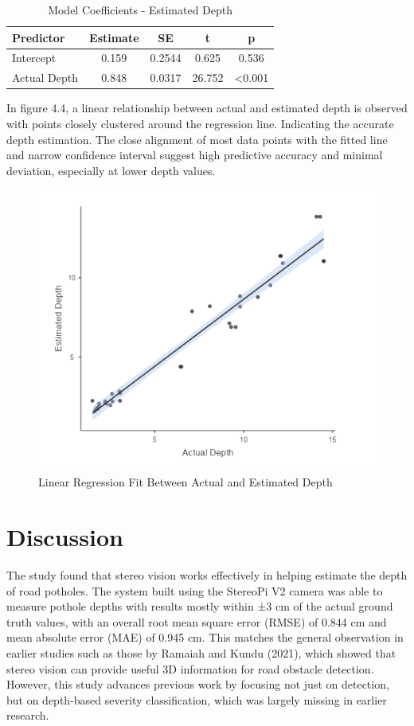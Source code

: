 \begin{table}[H]
	\centering
	\begin{tabular}{|l|c|c|c|c|}
		\hline
		\textbf{Predictor} & \textbf{Estimate} & \textbf{SE} & \textbf{t} & \textbf{p} \\
		\hline
		Intercept & 0.159 & 0.2544 & 0.625 & 0.536 \\
		Actual Depth & 0.848 & 0.0317 & 26.752 & \textless 0.001 \\
		\hline
	\end{tabular}
	\caption{Model Coefficients - Estimated Depth}
	\label{tab:model_coefficients}
\end{table}

In figure 4.4, a linear relationship between actual and estimated depth is observed with points closely clustered around the regression line. Indicating the accurate depth estimation. The close alignment of most data points with the fitted line and narrow confidence interval suggest high predictive accuracy and minimal deviation, especially at lower depth values.

\begin{figure}[H]
	\centering
	\includegraphics[scale=0.55]{regression.png}
	\caption{Linear Regression Fit Between Actual and Estimated Depth}
	\label{fig:model}
\end{figure}


\section{Discussion}
The study found that stereo vision works effectively in helping estimate the depth of road potholes. The system built using the StereoPi V2 camera was able to measure pothole depths with results mostly within ±3 cm of the actual ground truth values, with an overall root mean square error (RMSE) of 0.844 cm and mean absolute error (MAE) of 0.945 cm. This matches the general observation in earlier studies such as those by Ramaiah and Kundu (2021), which showed that stereo vision can provide useful 3D information for road obstacle detection. However, this study advances previous work by focusing not just on detection, but on depth-based severity classification, which was largely missing in earlier research.

